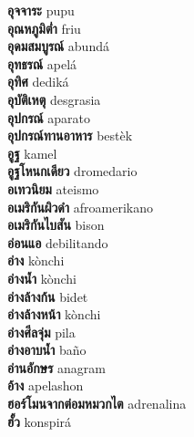 \textbf{ อุจจาระ  } pupu \\
\textbf{ อุณหภูมิต่ำ  } friu \\
\textbf{ อุดมสมบูรณ์  } abundá \\
\textbf{ อุทธรณ์  } apelá \\
\textbf{ อุทิศ  } dediká \\
\textbf{ อุบัติเหตุ  } desgrasia \\
\textbf{ อุปกรณ์  } aparato \\
\textbf{ อุปกรณ์ทานอาหาร  } bestèk \\
\textbf{ อูฐ  } kamel \\
\textbf{ อูฐโหนกเดียว  } dromedario \\
\textbf{ อเทวนิยม  } ateismo \\
\textbf{ อเมริกันผิวดำ  } afroamerikano \\
\textbf{ อเมริกันไบสัน  } bison \\
\textbf{ อ่อนแอ  } debilitando \\
\textbf{ อ่าง  } kònchi \\
\textbf{ อ่างน้ำ  } kònchi \\
\textbf{ อ่างล้างก้น  } bidet \\
\textbf{ อ่างล้างหน้า  } kònchi \\
\textbf{ อ่างศีลจุ่ม  } pila \\
\textbf{ อ่างอาบน้ำ  } baño \\
\textbf{ อ่านอักษร  } anagram \\
\textbf{ อ้าง  } apelashon \\
\textbf{ ฮอร์โมนจากต่อมหมวกไต  } adrenalina \\
\textbf{ ฮั้ว  } konspirá \\
